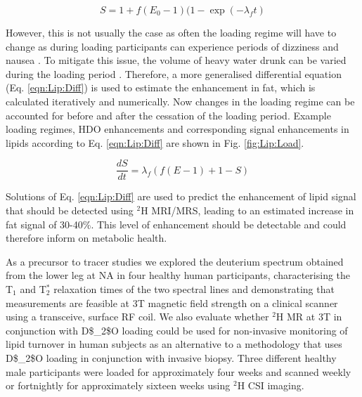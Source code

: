\begin{equation}
    S = 1 + f(E_0 - 1)(1 - \exp(-\lambda_ft)
    \label{eqn:Lip:Load}
\end{equation}

However, this is not usually the case as often the loading regime will have to change as during loading participants can experience periods of dizziness and nausea \cite{Money1974HeavyAlcohol}. To mitigate this issue, the volume of heavy water drunk can be varied during the loading period \cite{Strawford2004AdiposeO, Cocking2023DeuteriumDosing}. Therefore, a more generalised differential equation (Eq. \ref{eqn:Lip:Diff}) is used to estimate the enhancement in fat, which is calculated iteratively and numerically. Now changes in the loading regime can be accounted for before and after the cessation of the loading period. Example loading regimes, \ac{HDO} enhancements and corresponding signal enhancements in lipids according to Eq. \ref{eqn:Lip:Diff} are shown in Fig. \ref{fig:Lip:Load}.

\begin{equation}
    \frac{dS}{dt} = \lambda_f(f(E-1)+1-S)
    \label{eqn:Lip:Diff}
\end{equation}



Solutions of Eq. \ref{eqn:Lip:Diff} are used to predict the enhancement of lipid signal that should be detected using $^2$H \ac{MRI}/\ac{MRS}, leading to an estimated increase in fat signal of 30-40\%. This level of enhancement should be detectable and could therefore inform on metabolic health. 
 
As a precursor to tracer studies we explored the deuterium spectrum obtained from the lower leg at \ac{NA} in four healthy human participants, characterising the T$_1$ and T$_2^*$ relaxation times of the two spectral lines and demonstrating that measurements are feasible at 3T magnetic field strength on a clinical scanner using a transceive, surface \ac{RF} coil. We also evaluate whether $^2$H MR at 3T in conjunction with \ac{D$_2$O} loading could be used for non-invasive monitoring of lipid turnover in human subjects as an alternative to a methodology that uses \ac{D$_2$O} loading in conjunction with invasive biopsy. Three different healthy male participants were loaded for approximately four weeks and scanned weekly or fortnightly for approximately sixteen weeks using $^2$H \ac{CSI} imaging.

